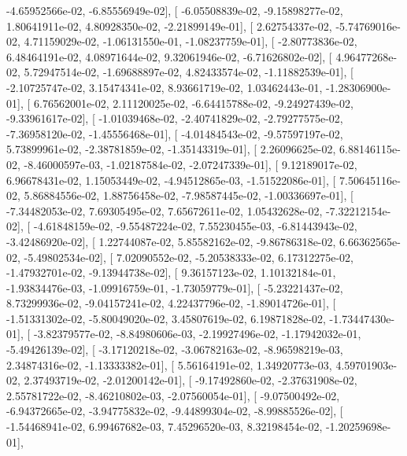 \documentclass{article}
\begin{document}
         -4.65952566e-02,  -6.85556949e-02],
       [ -6.05508839e-02,  -9.15898277e-02,   1.80641911e-02,
          4.80928350e-02,  -2.21899149e-01],
       [  2.62754337e-02,  -5.74769016e-02,   4.71159029e-02,
         -1.06131550e-01,  -1.08237759e-01],
       [ -2.80773836e-02,   6.48464191e-02,   4.08971644e-02,
          9.32061946e-02,  -6.71626802e-02],
       [  4.96477268e-02,   5.72947514e-02,  -1.69688897e-02,
          4.82433574e-02,  -1.11882539e-01],
       [ -2.10725747e-02,   3.15474341e-02,   8.93661719e-02,
          1.03462443e-01,  -1.28306900e-01],
       [  6.76562001e-02,   2.11120025e-02,  -6.64415788e-02,
         -9.24927439e-02,  -9.33961617e-02],
       [ -1.01039468e-02,  -2.40741829e-02,  -2.79277575e-02,
         -7.36958120e-02,  -1.45556468e-01],
       [ -4.01484543e-02,  -9.57597197e-02,   5.73899961e-02,
         -2.38781859e-02,  -1.35143319e-01],
       [  2.26096625e-02,   6.88146115e-02,  -8.46000597e-03,
         -1.02187584e-02,  -2.07247339e-01],
       [  9.12189017e-02,   6.96678431e-02,   1.15053449e-02,
         -4.94512865e-03,  -1.51522086e-01],
       [  7.50645116e-02,   5.86884556e-02,   1.88756458e-02,
         -7.98587445e-02,  -1.00336697e-01],
       [ -7.34482053e-02,   7.69305495e-02,   7.65672611e-02,
          1.05432628e-02,  -7.32212154e-02],
       [ -4.61848159e-02,  -9.55487224e-02,   7.55230455e-03,
         -6.81443943e-02,  -3.42486920e-02],
       [  1.22744087e-02,   5.85582162e-02,  -9.86786318e-02,
          6.66362565e-02,  -5.49802534e-02],
       [  7.02090552e-02,  -5.20538333e-02,   6.17312275e-02,
         -1.47932701e-02,  -9.13944738e-02],
       [  9.36157123e-02,   1.10132184e-01,  -1.93834476e-03,
         -1.09916759e-01,  -1.73059779e-01],
       [ -5.23221437e-02,   8.73299936e-02,  -9.04157241e-02,
          4.22437796e-02,  -1.89014726e-01],
       [ -1.51331302e-02,  -5.80049020e-02,   3.45807619e-02,
          6.19871828e-02,  -1.73447430e-01],
       [ -3.82379577e-02,  -8.84980606e-03,  -2.19927496e-02,
         -1.17942032e-01,  -5.49426139e-02],
       [ -3.17120218e-02,  -3.06782163e-02,  -8.96598219e-03,
          2.34874316e-02,  -1.13333382e-01],
       [  5.56164191e-02,   1.34920773e-03,   4.59701903e-02,
          2.37493719e-02,  -2.01200142e-01],
       [ -9.17492860e-02,  -2.37631908e-02,   2.55781722e-02,
         -8.46210802e-03,  -2.07560054e-01],
       [ -9.07500492e-02,  -6.94372665e-02,  -3.94775832e-02,
         -9.44899304e-02,  -8.99885526e-02],
       [ -1.54468941e-02,   6.99467682e-03,   7.45296520e-03,
          8.32198454e-02,  -1.20259698e-01],
\end{document}

